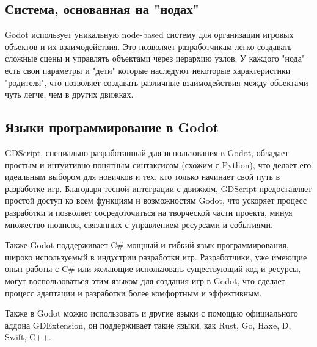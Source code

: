 \subsection{\label{subsec:ch01/sec01/sub03}Система, основанная на "нодах"}

Godot использует уникальную node-based систему для организации игровых объектов и их взаимодействия. Это позволяет разработчикам легко создавать сложные сцены и управлять объектами через иерархию узлов. У каждого "нода" есть свои параметры и "дети" которые наследуют некоторые характеристики "родителя", что позволяет создавать различные взаимодействия между объектами чуть легче, чем в других движках.

\subsection{\label{subsec:ch01/sec01/sub04}Языки программирование в Godot}

GDScript, специально разработанный для использования в Godot, обладает простым и интуитивно понятным синтаксисом (схожим с Python), что делает его идеальным выбором для новичков и тех, кто только начинает свой путь в разработке игр. Благодаря тесной интеграции с движком, GDScript предоставляет простой доступ ко всем функциям и возможностям Godot, что ускоряет процесс разработки и позволяет сосредоточиться на творческой части проекта, минуя множество нюансов, связанных с управлением ресурсами и событиями. 

Также Godot поддерживает C\# мощный и гибкий язык программирования, широко используемый в индустрии разработки игр. Разработчики, уже имеющие опыт работы с C\# или желающие использовать существующий код и ресурсы, могут воспользоваться этим языком для создания игр в Godot, что сделает процесс адаптации и разработки более комфортным и эффективным.

Также в Godot можно использовать и другие языки с помощью официального аддона GDExtension, он поддерживает такие языки, как Rust, Go, Haxe, D, Swift, C++. 

